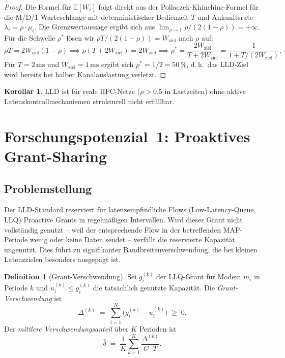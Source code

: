 ﻿\documentclass[a4paper,12pt]{article}
\theoremstyle{definition}
\newtheorem{definition}{Definition}
\newtheorem{korollar}{Korollar}
\begin{document}
\begin{proof}
    Die Formel f\"{u}r $\mathbb{E}[W_i]$ folgt direkt aus der Pollaczek-Khinchine-Formel
    f\"{u}r die M/D/1-Warteschlange mit deterministischer Bedienzeit $T$ und Ankunftsrate
    $\lambda_i = \rho \cdot \mu_i$. Die Grenzwertaussage ergibt sich aus
    $\lim_{\rho \to 1} \rho / (2(1-\rho)) = +\infty$. F\"{u}r die Schwelle $\rho^*$
    l\"{o}sen wir $\rho T / (2(1-\rho)) = W_{\mathrm{ziel}}$ nach $\rho$ auf:
    \[
        \rho T = 2 W_{\mathrm{ziel}} (1 - \rho) \implies
        \rho (T + 2 W_{\mathrm{ziel}}) = 2 W_{\mathrm{ziel}} \implies
        \rho^* = \frac{2 W_{\mathrm{ziel}}}{T + 2 W_{\mathrm{ziel}}} = \frac{1}{1 + T/(2W_{\mathrm{ziel}})}.
    \]
    F\"{u}r $T = 2\,\mathrm{ms}$ und $W_{\mathrm{ziel}} = 1\,\mathrm{ms}$ ergibt sich
    $\rho^* = 1/2 = 50\,\%$, d.\,h.\ das LLD-Ziel wird bereits bei halber
    Kanalauslastung verletzt.
\end{proof}

\begin{korollar}
    LLD ist f\"{u}r reale HFC-Netze ($\rho > 0.5$ in Lastzeiten) ohne aktive
    Latenzkontrollmechanismen strukturell nicht erf\"{u}llbar.
\end{korollar}

\section{Forschungspotenzial~1: Proaktives Grant-Sharing}

\subsection{Problemstellung}

Der LLD-Standard reserviert f\"{u}r latenzempfindliche Flows (Low-Latency-Queue, LLQ)
Proactive Grants in regelm\"{a}{\ss}igen Intervallen. Wird dieser Grant nicht vollst\"{a}ndig
genutzt -- weil der entsprechende Flow in der betreffenden MAP-Periode wenig oder
keine Daten sendet -- verf\"{a}llt die reservierte Kapazit\"{a}t ungenutzt. Dies f\"{u}hrt zu
signifikanter Bandbreitenverschwendung, die bei kleinen Latenzzielen besonders
ausgep\"{a}gt ist.

\begin{definition}[Grant-Verschwendung]
    Sei $g_i^{(k)}$ der LLQ-Grant f\"{u}r Modem $m_i$ in Periode $k$ und
    $u_i^{(k)} \leq g_i^{(k)}$ die tats\"{a}chlich genutzte Kapazit\"{a}t. Die
    \emph{Grant-Verschwendung} ist
    \[
        \Delta^{(k)} \;=\; \sum_{i=1}^{N} \bigl(g_i^{(k)} - u_i^{(k)}\bigr) \;\geq\; 0.
    \]
    Der \emph{mittlere Verschwendungsanteil} \"{u}ber $K$ Perioden ist
    \[
        \bar{\delta} \;=\; \frac{1}{K} \sum_{k=1}^{K} \frac{\Delta^{(k)}}{C \cdot T}.
    \]
\end{definition}
\end{document}
